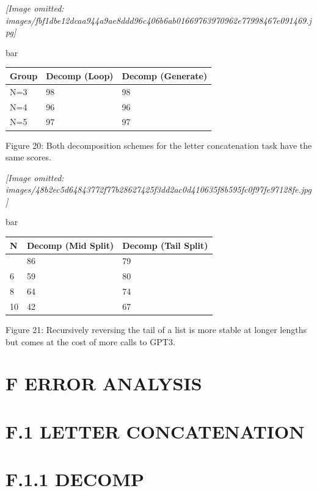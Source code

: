 \documentclass[
]{article}
\newcounter{none} %
\begin{document}
\textit{[Image omitted: images/fbf1dbe12dcaa944a9ae8ddd96c406b6ab01669763970962e77998467e091469.jpg]}

bar

{\def\LTcaptype{none} %
\begin{longtable}[]{@{}lll@{}}
\toprule\noalign{}
Group & Decomp (Loop) & Decomp (Generate) \\
\midrule\noalign{}
\endhead
\bottomrule\noalign{}
\endlastfoot
N=3 & 98 & 98 \\
N=4 & 96 & 96 \\
N=5 & 97 & 97 \\
\end{longtable}
}

Figure 20: Both decomposition schemes for the letter concatenation task
have the same scores.

\textit{[Image omitted: images/48b2ec5d64843772f77b28627425f3dd2ac0d410635f8b595fc0f97fe97128fe.jpg]}

bar

{\def\LTcaptype{none} %
\begin{longtable}[]{@{}lll@{}}
\toprule\noalign{}
N & Decomp (Mid Split) & Decomp (Tail Split) \\
\midrule\noalign{}
\endhead
\bottomrule\noalign{}
\endlastfoot
4 & 86 & 79 \\
6 & 59 & 80 \\
8 & 64 & 74 \\
10 & 42 & 67 \\
\end{longtable}
}

Figure 21: Recursively reversing the tail of a list is more stable at
longer lengths but comes at the cost of more calls to GPT3.

\section{F ERROR ANALYSIS}\label{f-error-analysis}

\section{F.1 LETTER CONCATENATION}\label{f.1-letter-concatenation}

\section{F.1.1 DECOMP}\label{f.1.1-decomp}
\end{document}
